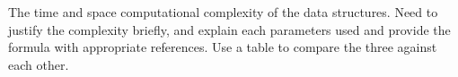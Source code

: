 The time and space computational complexity of the data structures. Need to justify the complexity briefly, and explain each parameters used and provide the formula with appropriate references. Use a table to compare the three against each other. 